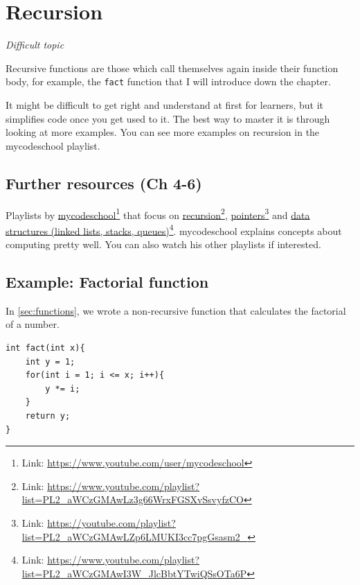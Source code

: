\chapter{Recursion}

\textit{Difficult topic}
\vspace{6mm}

Recursive functions are those which call themselves again inside their function body, for example, the \texttt{fact} function that I will introduce down the chapter.

It might be difficult to get right and understand at first for learners, but it simplifies code once you get used to it. The best way to master it is through looking at more examples. You can see more examples on recursion in the mycodeschool playlist.

\section{Further resources (Ch 4-6)}

Playlists by 
\href{https://www.youtube.com/user/mycodeschool}{mycodeschool}\footnote{Link: \href{https://www.youtube.com/user/mycodeschool}{https://www.youtube.com/user/mycodeschool}}
that focus on 
\href{https://www.youtube.com/playlist?list=PL2\_aWCzGMAwLz3g66WrxFGSXvSsvyfzCO}{recursion}\footnote{Link: \href{https://www.youtube.com/playlist?list=PL2\_aWCzGMAwLz3g66WrxFGSXvSsvyfzCO}{https://www.youtube.com/playlist?list=PL2\_aWCzGMAwLz3g66WrxFGSXvSsvyfzCO}}, 
\href{https://youtube.com/playlist?list=PL2_aWCzGMAwLZp6LMUKI3cc7pgGsasm2_}{pointers}\footnote{Link: \href{https://youtube.com/playlist?list=PL2_aWCzGMAwLZp6LMUKI3cc7pgGsasm2_}{https://youtube.com/playlist?list=PL2\_aWCzGMAwLZp6LMUKI3cc7pgGsasm2\_}} and 
\href{https://www.youtube.com/playlist?list=PL2_aWCzGMAwI3W_JlcBbtYTwiQSsOTa6P}{data structures (linked lists, stacks, queues)}\footnote{Link: \href{https://www.youtube.com/playlist?list=PL2_aWCzGMAwI3W_JlcBbtYTwiQSsOTa6P}{https://www.youtube.com/playlist?list=PL2\_aWCzGMAwI3W\_JlcBbtYTwiQSsOTa6P}}.
mycodeschool explains concepts about computing pretty well. You can also watch his other playlists if interested.

\section{Example: Factorial function}

In \cref{sec:functions}, we wrote a non-recursive function that calculates the factorial of a number.
\begin{lstlisting}
int fact(int x){
    int y = 1;
    for(int i = 1; i <= x; i++){
        y *= i;
    }
    return y;
}
\end{lstlisting}

